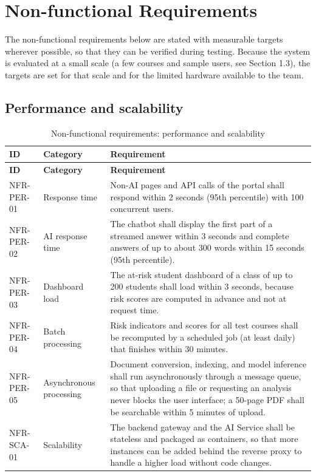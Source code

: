 \section{Non-functional Requirements}

The non-functional requirements below are stated with measurable targets wherever possible, so that they can be verified during testing. Because the system is evaluated at a small scale (a few courses and sample users, see Section 1.3), the targets are set for that scale and for the limited hardware available to the team.

\newcommand{\nfrtablehead}{%
\hline
\textbf{ID} & \textbf{Category} & \textbf{Requirement} \\ \hline}

\newenvironment{nfrtable}[2]{%
\small\renewcommand{\arraystretch}{1.15}
\begin{longtable}{|>{\raggedright\arraybackslash}p{0.17\textwidth}|>{\raggedright\arraybackslash}p{0.17\textwidth}|>{\raggedright\arraybackslash}p{0.56\textwidth}|}
\caption{#1}\label{#2}\\
\nfrtablehead
\endfirsthead
\nfrtablehead
\endhead
}{%
\end{longtable}}

\subsection{Performance and scalability}
\begin{nfrtable}{Non-functional requirements: performance and scalability}{tab:nfr-performance}
NFR-PER-01 & Response time & Non-AI pages and API calls of the portal shall respond within 2 seconds (95th percentile) with 100 concurrent users. \\ \hline
NFR-PER-02 & AI response time & The chatbot shall display the first part of a streamed answer within 3 seconds and complete answers of up to about 300 words within 15 seconds (95th percentile). \\ \hline
NFR-PER-03 & Dashboard load & The at-risk student dashboard of a class of up to 200 students shall load within 3 seconds, because risk scores are computed in advance and not at request time. \\ \hline
NFR-PER-04 & Batch processing & Risk indicators and scores for all test courses shall be recomputed by a scheduled job (at least daily) that finishes within 30 minutes. \\ \hline
NFR-PER-05 & Asynchronous processing & Document conversion, indexing, and model inference shall run asynchronously through a message queue, so that uploading a file or requesting an analysis never blocks the user interface; a 50-page PDF shall be searchable within 5 minutes of upload. \\ \hline
NFR-SCA-01 & Scalability & The backend gateway and the AI Service shall be stateless and packaged as containers, so that more instances can be added behind the reverse proxy to handle a higher load without code changes. \\ \hline
\end{nfrtable}

